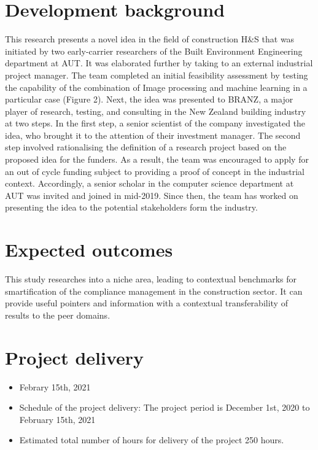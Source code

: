 \documentclass{article}
\begin{document}
\section{Development background}
\label{sec:orge4e1137}

This research presents a novel idea in the field of construction H\&S that was initiated by two early-carrier researchers of the Built Environment Engineering department at AUT. It was elaborated further by taking to an external industrial project manager.
The team completed an initial feasibility assessment by testing the capability of the combination of Image processing and machine learning in a particular case (Figure 2).
Next, the idea was presented to BRANZ, a major player of research, testing, and consulting in the New Zealand building industry at two steps.
In the first step, a senior scientist of the company investigated the idea, who brought it to the attention of their investment manager.
The second step involved rationalising the definition of a research project based on the proposed idea for the funders. As a result, the team was encouraged to apply for an out of cycle funding subject to providing a proof of concept in the industrial context.
Accordingly, a senior scholar in the computer science department at AUT was invited and joined in mid-2019.
Since then, the team has worked on presenting the idea to the potential stakeholders form the industry. 

\section{Expected outcomes}
\label{sec:org1b974eb}

  This study researches into a niche area, leading to contextual benchmarks for smartification of the compliance management in the construction sector.
It can provide useful pointers and information with a contextual transferability of results to the peer domains.

\section{Project delivery}
\label{sec:orgb8a0f65}
\begin{itemize}
\item Febrary 15th, 2021
\end{itemize}

\begin{itemize}
\item Schedule of the project delivery: The project period is December 1st, 2020 to February 15th, 2021
\item Estimated total number of hours for delivery of the project 250 hours.
\end{itemize}
\end{document}
